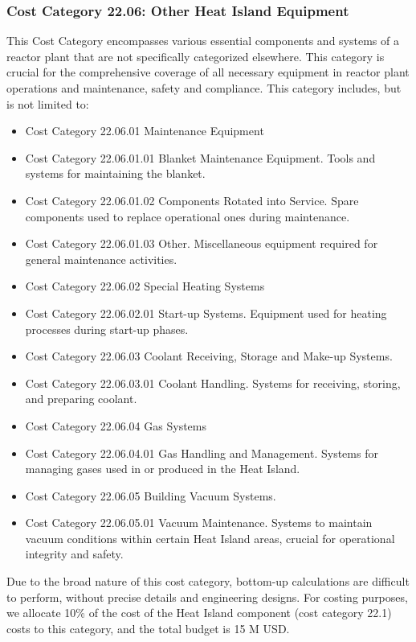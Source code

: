 \subsubsection{Cost Category 22.06: Other Heat Island Equipment}

This Cost Category encompasses various essential components and systems of a reactor plant that are not specifically categorized elsewhere. This category is crucial for the comprehensive coverage of all necessary equipment in reactor plant operations and maintenance, safety and compliance.  This category includes, but is not limited to:


\begin{itemize}
    \item Cost Category 22.06.01 Maintenance Equipment
    \item Cost Category 22.06.01.01 Blanket Maintenance Equipment. Tools and systems for maintaining the blanket.
    \item Cost Category 22.06.01.02 Components Rotated into Service. Spare components used to replace operational ones during maintenance.
    \item Cost Category 22.06.01.03 Other. Miscellaneous equipment required for general maintenance activities.
    \item Cost Category 22.06.02 Special Heating Systems
    \item Cost Category 22.06.02.01 Start-up Systems. Equipment used for heating processes during start-up phases.
    \item Cost Category 22.06.03 Coolant Receiving, Storage and Make-up Systems.
    \item Cost Category 22.06.03.01 Coolant Handling. Systems for receiving, storing, and preparing coolant.
    \item Cost Category 22.06.04 Gas Systems
    \item Cost Category 22.06.04.01 Gas Handling and Management. Systems for managing gases used in or produced in the Heat Island.
    \item Cost Category 22.06.05 Building Vacuum Systems.
    \item Cost Category 22.06.05.01 Vacuum Maintenance. Systems to maintain vacuum conditions within certain Heat Island areas, crucial for operational integrity and safety.
\end{itemize}

Due to the broad nature of this cost category, bottom-up calculations are difficult to perform, without precise details and engineering designs. For costing purposes, we allocate 10\% of the cost of the Heat Island component (cost category 22.1) costs to this category, and the total budget is 15 M USD.